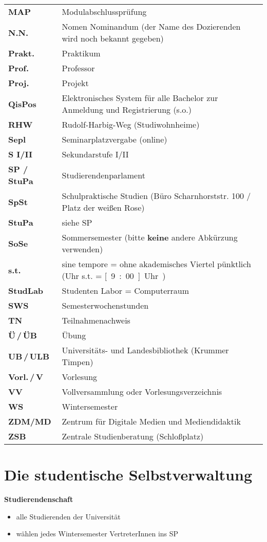 \begin{longtable}{p{} p{}}
  \textbf{MAP} & Modulabschlussprüfung\\
  \textbf{N.N.} & Nomen Nominandum (der Name des Dozierenden wird noch bekannt gegeben)\\
  \textbf{Prakt.} & Praktikum\\
  \textbf{Prof.} & Professor\\
  \textbf{Proj.} & Projekt\\
  \textbf{QisPos} & Elektronisches System für alle Bachelor zur Anmeldung und Registrierung (s.o.)\\
  \textbf{RHW} & Rudolf-Harbig-Weg (Studiwohnheime)\\
  \textbf{Sepl} & Seminarplatzvergabe (online)\\
  \textbf{S I/II} & Sekundarstufe I/II\\
  \textbf{SP / StuPa} & Studierendenparlament\\ 
  \textbf{SpSt} & Schulpraktische Studien (Büro Scharnhorststr. 100 / Platz der weißen Rose)\\
  \textbf{StuPa} & siehe SP\\
  \textbf{SoSe} & Sommersemester (bitte \textbf{keine} andere Abkürzung verwenden)\\
  \textbf{s.t.}	& sine tempore = ohne akademisches Viertel pünktlich (\unit[9]{Uhr} s.t. = \unit[9:00]{Uhr})\\
  \textbf{StudLab} & Studenten Labor = Computerraum\\
  \textbf{SWS} & Semesterwochenstunden\\
  \textbf{TN} & Teilnahmenachweis\\
  \textbf{Ü\,/\,ÜB} & Übung\\
  \textbf{UB\,/\,ULB} & Universitäts- und Landesbibliothek (Krummer Timpen)\\
  \textbf{Vorl.\,/\,V} & Vorlesung\\
  \textbf{VV} & Vollversammlung oder Vorlesungsverzeichnis\\
  \textbf{WS} & Wintersemester\\
  \textbf{ZDM/MD} & Zentrum für Digitale Medien und Mediendidaktik\\
  \textbf{ZSB} & Zentrale Studienberatung (Schloßplatz)\\
\end{longtable} 

\newpage
\section{Die studentische Selbstverwaltung}
\textbf{Studierendenschaft}
\begin{itemize}
 \item alle Studierenden der Universität
 \item wählen jedes Wintersemester VertreterInnen ins SP
\end{itemize}

